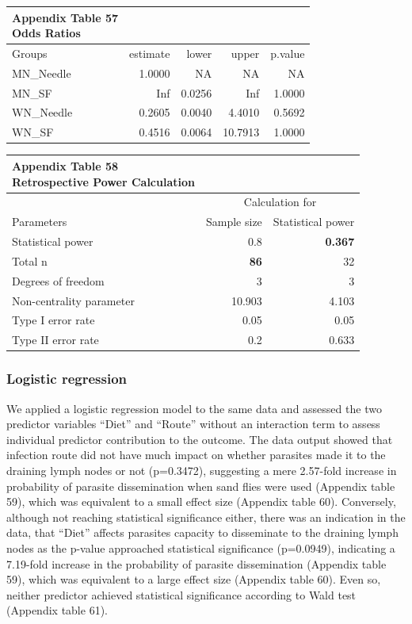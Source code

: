 \documentclass[
  12pt,
  letterpaper,
]{article}
\begin{document}
\begingroup
\fontsize{12.0pt}{14.4pt}\selectfont
\begin{longtable}{l|rrrr}
\caption*{
{\large \textbf{Appendix Table 57}} \\ 
{\small \textbf{Odds Ratios}}
} \\ 
\toprule
Groups & {estimate} & {lower} & {upper} & {p.value} \\ 
\midrule\addlinespace[2.5pt]
MN\_Needle & 1.0000 & NA & NA & NA \\ 
MN\_SF &    Inf & 0.0256 &     Inf & 1.0000 \\ 
WN\_Needle & 0.2605 & 0.0040 &  4.4010 & 0.5692 \\ 
WN\_SF & 0.4516 & 0.0064 & 10.7913 & 1.0000 \\ 
\bottomrule
\end{longtable}
\endgroup

\begingroup
\fontsize{12.0pt}{14.4pt}\selectfont
\begin{longtable}{l|rr}
\caption*{
{\large \textbf{Appendix Table 58}} \\ 
{\small \textbf{Retrospective Power Calculation}}
} \\ 
\toprule
 & \multicolumn{2}{c}{Calculation for} \\ 
\cmidrule(lr){2-3}
Parameters & {Sample size} & {Statistical power} \\ 
\midrule\addlinespace[2.5pt]
Statistical power & 0.8 & {\bfseries 0.367} \\ 
Total n & {\bfseries 86} & 32 \\ 
Degrees of freedom & 3 & 3 \\ 
Non-centrality parameter & 10.903 & 4.103 \\ 
Type I error rate & 0.05 & 0.05 \\ 
Type II error rate & 0.2 & 0.633 \\ 
\bottomrule
\end{longtable}
\endgroup

\subsubsection{Logistic regression}\label{logistic-regression}

We applied a logistic regression model to the same data and assessed the two predictor variables ``Diet'' and ``Route'' without an interaction term to assess individual predictor contribution to the outcome. The data output showed that infection route did not have much impact on whether parasites made it to the draining lymph nodes or not (p=0.3472), suggesting a mere 2.57-fold increase in probability of parasite dissemination when sand flies were used (Appendix table 59), which was equivalent to a small effect size (Appendix table 60). Conversely, although not reaching statistical significance either, there was an indication in the data, that ``Diet'' affects parasites capacity to disseminate to the draining lymph nodes as the p-value approached statistical significance (p=0.0949), indicating a 7.19-fold increase in the probability of parasite dissemination (Appendix table 59), which was equivalent to a large effect size (Appendix table 60). Even so, neither predictor achieved statistical significance according to Wald test (Appendix table 61).
\end{document}

